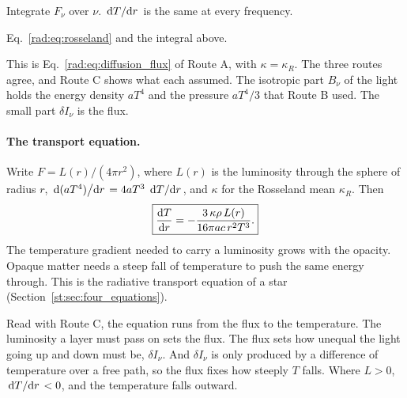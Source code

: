 \begin{explain}
	\item Integrate $F_\nu$ over $\nu$. $\dv*{T}{r}$ is the same at every frequency.
	\item Eq.~\eqref{rad:eq:rosseland} and the integral above.
\end{explain}
This is Eq.~\eqref{rad:eq:diffusion_flux} of Route A, with $\kappa=\kappa_R$. The three routes agree, and Route C shows what each assumed. The isotropic part $B_\nu$ of the light holds the energy density $aT^4$ and the pressure $aT^4/3$ that Route B used. The small part $\delta I_\nu$ is the flux.

\paragraph{The transport equation.} Write $F=L(r)/(4\pi r^2)$, where $L(r)$ is the luminosity through the sphere of radius $r$, $\dv*{(aT^4)}{r}=4aT^3\,\dv*{T}{r}$, and $\kappa$ for the Rosseland mean $\kappa_R$. Then
\begin{equation}
	\boxed{\dv{T}{r}=-\frac{3\,\kappa\rho\,L(r)}{16\pi a c\,r^2T^3}.}
	\label{rad:eq:radiative_transport}
\end{equation}
The temperature gradient needed to carry a luminosity grows with the opacity. Opaque matter needs a steep fall of temperature to push the same energy through. This is the radiative transport equation of a star (Section~\ref{st:sec:four_equations}).

Read with Route C, the equation runs from the flux to the temperature. The luminosity a layer must pass on sets the flux. The flux sets how unequal the light going up and down must be, $\delta I_\nu$. And $\delta I_\nu$ is only produced by a difference of temperature over a free path, so the flux fixes how steeply $T$ falls. Where $L>0$, $\dv*{T}{r}<0$, and the temperature falls outward.

